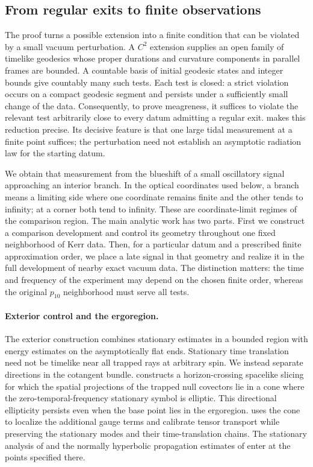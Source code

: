 \subsection{From regular exits to finite observations}

The proof turns a possible extension into a finite condition that can
be violated by a small vacuum perturbation. A \(C^2\) extension supplies
an open family of timelike geodesics whose proper durations and curvature
components in parallel frames are bounded. A countable basis of initial
geodesic states and integer bounds give countably many such tests.
Each test is closed: a strict violation occurs on a compact geodesic
segment and persists under a sufficiently small change of the data.
Consequently, to prove meagreness, it suffices to violate the relevant
test arbitrarily close to every datum admitting a regular exit.
 makes this reduction precise. Its decisive feature
is that one large tidal measurement at a finite point suffices; the
perturbation need not establish an asymptotic radiation law for the
starting datum.

We obtain that measurement from the blueshift of a small oscillatory
signal approaching an interior branch. In the optical coordinates used
below, a branch means a limiting side where one coordinate remains finite
and the other tends to infinity; at a corner both tend to infinity.
These are coordinate-limit regimes of the comparison region.
The main analytic work has two
parts. First we construct a comparison development and control its
geometry throughout one fixed neighborhood of Kerr data. Then, for a
particular datum and a prescribed finite approximation order, we place
a late signal in that geometry and realize it in the full development
of nearby exact vacuum data. The distinction matters: the time and
frequency of the experiment may depend on the chosen finite order,
whereas the original \(p_{10}\) neighborhood must serve all tests.

\paragraph{Exterior control and the ergoregion.}
The exterior construction combines stationary estimates in a bounded
region with energy estimates on the asymptotically flat ends.
Stationary time translation need not be timelike near all trapped rays
at arbitrary spin. We instead separate directions in the cotangent
bundle.  constructs a horizon-crossing spacelike
slicing for which the spatial projections of the trapped null
covectors lie in a cone where the zero-temporal-frequency stationary
symbol is elliptic. This directional ellipticity persists even when
the base point lies in the ergoregion.  uses the
cone to localize the additional gauge terms and calibrate tensor
transport while preserving the stationary modes and their
time-translation chains. The stationary analysis of
\cite{HHV2025} and the normally hyperbolic propagation estimates of
\cite{Dyatlov2016,Hintz2017} enter at the points specified there.

